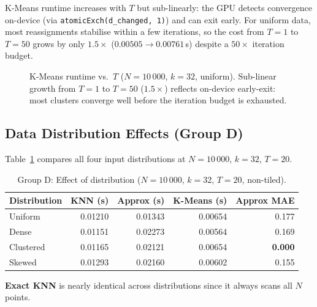 \documentclass[11pt,a4paper]{article}
\begin{document}
K-Means runtime increases with $T$ but sub-linearly: the GPU detects
convergence on-device (via \texttt{atomicExch(d\_changed, 1)}) and can exit
early.  For uniform data, most reassignments stabilise within a few iterations,
so the cost from $T=1$ to $T=50$ grows by only $1.5\times$ ($0.00505 \to 0.00761$\,s)
despite a $50\times$ iteration budget.

\begin{figure}[H]
\centering
{}
\caption{K-Means runtime vs.\ $T$ ($N=10\,000$, $k=32$, uniform).  Sub-linear
growth from $T=1$ to $T=50$ ($1.5\times$) reflects on-device early-exit: most
clusters converge well before the iteration budget is exhausted.}
\label{fig:vary_T}
\end{figure}

\subsection{Data Distribution Effects (Group D)}

Table~\ref{tab:vary_dist} compares all four input distributions at
$N=10\,000$, $k=32$, $T=20$.

\begin{table}[H]
\centering
\caption{Group D: Effect of distribution ($N=10\,000$, $k=32$, $T=20$,
non-tiled).}
\label{tab:vary_dist}
\begin{tabular}{lrrrr}
\toprule
Distribution & KNN (s) & Approx (s) & K-Means (s) & Approx MAE \\
\midrule
Uniform   & 0.01210 & 0.01343 & 0.00654 & 0.177 \\
Dense     & 0.01151 & 0.02273 & 0.00564 & 0.169 \\
Clustered & 0.01165 & 0.02121 & 0.00654 & \textbf{0.000} \\
Skewed    & 0.01293 & 0.02160 & 0.00602 & 0.155 \\
\bottomrule
\end{tabular}
\end{table}

\textbf{Exact KNN} is nearly identical across distributions since it always
scans all $N$ points.
\end{document}
